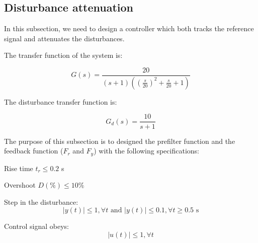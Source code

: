 \subsection{Disturbance attenuation}

In this subsection, we need to design a controller which both tracks the reference signal and attenuates the disturbances.

The transfer function of the system is:

$$G(s) = \frac{20}{(s+1)((\frac{s}{20})^2+\frac{s}{20}+1)}$$

The disturbance transfer function is:

$$G_d(s) = \frac{10}{s+1}$$

The purpose of this subsection is to designed the prefilter function and the feedback function ($F_r$ and $F_y$) with the following specifications:

\begin{shortitemize}
    \item Rise time $t_r \leq 0.2$ s
    \item Overshoot $D(\%) \leq 10\%$
    \item Step in the disturbance:
        $$|y(t)| \leq 1, \forall t \text{ and } |y(t)| \leq 0.1, \forall t \geq 0.5\text{ s}$$ 
    \item Control signal obeys:
        $$|u(t)| \leq 1, \forall t$$
\end{shortitemize}


% 
% 
% 
